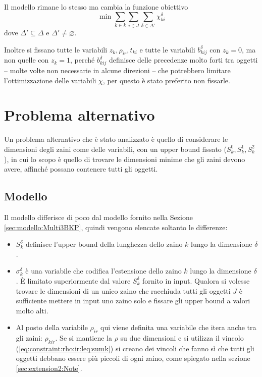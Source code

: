 \documentclass{scrartcl}
\begin{document}
Il modello rimane lo stesso ma cambia la funzione obiettivo
\begin{equation}
\text{ min } \sum_{k\in k}\sum_{i \in J}\sum_{\delta \in \Delta'} \chi_{ki}^\delta
\end{equation}
dove $\Delta' \subseteq \Delta$ e $\Delta' \neq \varnothing$.

Inoltre si fissano tutte le variabili $z_k, \rho_{ir}, t_{ki}$ e tutte le variabili $b_{kij}^\delta$ con $z_k = 0$, ma non quelle con $z_k = 1$, perché $b_{kij}^\delta$ definisce delle precedenze molto forti tra oggetti -- molte volte non necessarie in alcune direzioni -- che potrebbero limitare l'ottimizzazione delle variabili $\chi$, per questo è stato preferito non fissarle.


\section{Problema alternativo}
\label{sec:extension2}
Un problema alternativo che è  stato analizzato è quello di considerare le dimensioni degli zaini come delle variabili, con un upper bound fissato ($S_k^0, S_k^1, S_k^2$), in cui lo scopo è quello di trovare le dimensioni minime che gli zaini devono avere, affinché possano contenere tutti gli oggetti.

\subsection{Modello}
Il modello differisce di poco dal modello fornito nella
Sezione \ref{sec:modello:Multi3BKP}, quindi vengono elencate soltanto le differenze:
\begin{itemize}
	\item $S_k^\delta$ definisce l'upper bound della lunghezza dello zaino $k$ lungo la dimensione $\delta$.
	
	\item $\sigma_k^\delta$ è una variabile che codifica l'estensione dello zaino $k$ lungo la dimensione $\delta$. È limitato superiormente dal valore $S_k^\delta$ fornito in input.
	Qualora si volesse trovare le dimensioni di un unico zaino che racchiuda tutti gli oggetti $J$ è sufficiente	mettere in input uno zaino solo e fissare gli upper bound a valori molto alti. 
	
	\item Al posto della variabile $\rho_{ir}$ qui viene definita una variabile che itera anche tra gli zaini: $\rho_{kir}$. 
	Se si mantiene la $\rho$ su due dimensioni e si utilizza il vincolo (\ref{eq:constraint:rho:ir:leq:sumk}) si creano dei vincoli che fanno sì che tutti gli oggetti debbano essere più piccoli di ogni zaino, come spiegato nella sezione \ref{sec:extension2:Note}.
\end{itemize}
\end{document}
